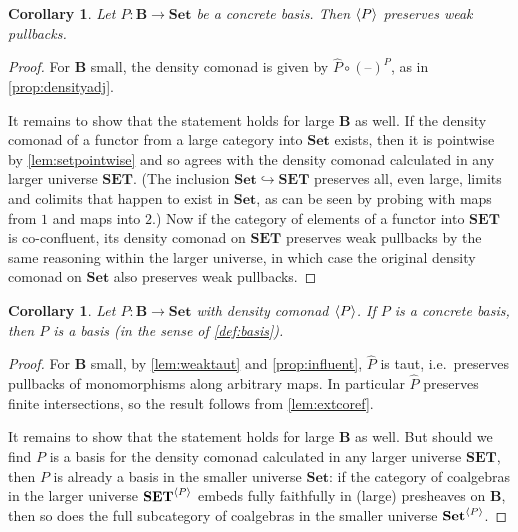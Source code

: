 \documentclass[11pt, oneside, article]{memoir}
\theoremstyle{plain}
\newtheorem{corollary}[theorem]{Corollary}
\theoremstyle{definition}
\theoremstyle{remark}
\DeclarePairedDelimiter{\gen}{\langle}{\rangle}
\newcommand{\dash}{{\mathord{\text{--}}}}
\newcommand{\namedcat}[1]{\mathbf{#1}}
\newcommand{\cat}[1]{\mathbf{#1}}
\newcommand{\Set}{\namedcat{Set}}
\newcommand{\SET}{\namedcat{SET}}
\newcommand{\CoalgOn}[2]{{#2}^{#1}}
\newcommand{\extend}[1]{\widehat{#1}}
\newcommand{\nerve}[1]{(\dash)^{#1}}
\newcommand{\ph}[1]{#1}
\newcommand{\bB}{\cat{B}}
\newcommand{\bS}{\cat{S}}
\newcommand{\pP}{\ph{P}}
\newcommand{\cP}{\gen{\pP}}
\newcommand{\anoteNI}[1]{}
\begin{document}
\begin{corollary}\label{cor:influentwp}
  Let $\pP \colon \bB \to \Set$ be a concrete basis. Then $\cP$
  preserves weak pullbacks.
\end{corollary}
\begin{proof}
  For $\bB$ small, the density comonad is given by
  $\extend{\pP} \circ \nerve{\pP}$, as in \cref{prop:densityadj}.

  It remains to show that the statement holds for large $\bB$ as
  well. If the density comonad of a functor from a large category into
  $\Set$ exists, then it is pointwise by \cref{lem:setpointwise} and
  so agrees with the density comonad calculated in any larger universe
  $\SET$. (The inclusion $\Set \hookrightarrow \SET$ preserves all,
  even large, limits and colimits that happen to exist in $\Set$, as
  can be seen by probing with maps from $1$ and maps into $2$.) Now if
  the category of elements of a functor into $\SET$ is co-confluent,
  its density comonad on $\SET$ preserves weak pullbacks by the same
  reasoning within the larger universe, in which case the original
  density comonad on $\Set$ also preserves weak pullbacks.
\end{proof}

\begin{corollary}\label{cor:influentbasis}
  Let $\pP \colon \bB \to \Set$ with density comonad $\cP$. If $\pP$
  is a concrete basis, then $\pP$ is a basis (in the sense of
  \cref{def:basis}).
\end{corollary}
\begin{proof}
  For $\bB$ small, by \cref{lem:weaktaut} and \cref{prop:influent}, $\extend{\pP}$ is
  taut, i.e.\ preserves pullbacks of monomorphisms along arbitrary
  maps. In particular $\extend{\pP}$ preserves finite intersections,
  so the result follows from \cref{lem:extcoref}.

  It remains to show that the statement holds for large $\bB$ as
  well. But should we find $\pP$ is a basis for the density comonad
  calculated in any larger universe $\SET$, then $\pP$ is already a
  basis in the smaller universe $\Set$: if the category of coalgebras
  in the larger universe $\CoalgOn{\cP}{\SET}$ embeds fully faithfully
  in (large) presheaves on $\bB$, then so does the full subcategory of
  coalgebras in the smaller universe $\CoalgOn{\cP}{\Set}$.
\end{proof}

\anoteNI{Does an analogue work in the generality of $\pP \colon \bB \to \bS$,
  using general ``weak-pullback-flatness''?}
\end{document}
